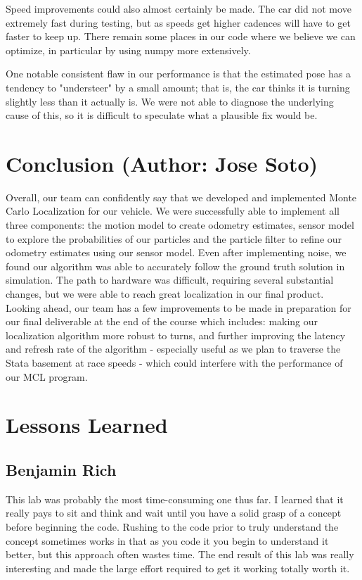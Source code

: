 \documentclass{article}
\begin{document}
Speed improvements could also almost certainly be made. The car did not move extremely fast during testing, but as speeds get higher cadences will have to get faster to keep up. There remain some places in our code where we believe we can optimize, in particular by using numpy more extensively.

One notable consistent flaw in our performance is that the estimated pose has a tendency to "understeer" by a small amount; that is, the car thinks it is turning slightly less than it actually is. We were not able to diagnose the underlying cause of this, so it is difficult to speculate what a plausible fix would be.

\section{Conclusion (Author: Jose Soto)}

Overall, our team can confidently say that we developed and implemented Monte Carlo Localization for our vehicle. We were successfully able to implement all three components: the motion model to create odometry estimates, sensor model to explore the probabilities of our particles and the particle filter to refine our odometry estimates using our sensor model. Even after implementing noise, we found our algorithm was able to accurately follow the ground truth solution in simulation. The path to hardware was difficult, requiring several substantial changes, but we were able to reach great localization in our final product. \\

Looking ahead, our team has a few improvements to be made in preparation for our final deliverable at the end of the course which includes: making our localization algorithm more robust to turns, and further improving the latency and refresh rate of the algorithm - especially useful as we plan to traverse the Stata basement at race speeds - which could interfere with the performance of our MCL program. 


\section{Lessons Learned}

\subsection{Benjamin Rich}
This lab was probably the most time-consuming one thus far. I learned that it really pays to sit and think and wait until you have a solid grasp of a concept before beginning the code. Rushing to the code prior to truly understand the concept sometimes works in that as you code it you begin to understand it better, but this approach often wastes time. The end result of this lab was really interesting and made the large effort required to get it working totally worth it. 
\end{document}
